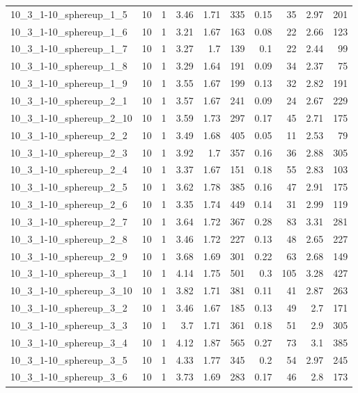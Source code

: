 \begin{center}
\begin{scriptsize}
\begin{longtable}{lrrrrrrrrr}
10\_3\_1-10\_sphereup\_1\_5 & 10 & 1 & 3.46 & 1.71 & 335 & 0.15 & 35 & 2.97 & 201\\
10\_3\_1-10\_sphereup\_1\_6 & 10 & 1 & 3.21 & 1.67 & 163 & 0.08 & 22 & 2.66 & 123\\
10\_3\_1-10\_sphereup\_1\_7 & 10 & 1 & 3.27 & 1.7 & 139 & 0.1 & 22 & 2.44 & 99\\
10\_3\_1-10\_sphereup\_1\_8 & 10 & 1 & 3.29 & 1.64 & 191 & 0.09 & 34 & 2.37 & 75\\
10\_3\_1-10\_sphereup\_1\_9 & 10 & 1 & 3.55 & 1.67 & 199 & 0.13 & 32 & 2.82 & 191\\
10\_3\_1-10\_sphereup\_2\_1 & 10 & 1 & 3.57 & 1.67 & 241 & 0.09 & 24 & 2.67 & 229\\
10\_3\_1-10\_sphereup\_2\_10 & 10 & 1 & 3.59 & 1.73 & 297 & 0.17 & 45 & 2.71 & 175\\
10\_3\_1-10\_sphereup\_2\_2 & 10 & 1 & 3.49 & 1.68 & 405 & 0.05 & 11 & 2.53 & 79\\
10\_3\_1-10\_sphereup\_2\_3 & 10 & 1 & 3.92 & 1.7 & 357 & 0.16 & 36 & 2.88 & 305\\
10\_3\_1-10\_sphereup\_2\_4 & 10 & 1 & 3.37 & 1.67 & 151 & 0.18 & 55 & 2.83 & 103\\
10\_3\_1-10\_sphereup\_2\_5 & 10 & 1 & 3.62 & 1.78 & 385 & 0.16 & 47 & 2.91 & 175\\
10\_3\_1-10\_sphereup\_2\_6 & 10 & 1 & 3.35 & 1.74 & 449 & 0.14 & 31 & 2.99 & 119\\
10\_3\_1-10\_sphereup\_2\_7 & 10 & 1 & 3.64 & 1.72 & 367 & 0.28 & 83 & 3.31 & 281\\
10\_3\_1-10\_sphereup\_2\_8 & 10 & 1 & 3.46 & 1.72 & 227 & 0.13 & 48 & 2.65 & 227\\
10\_3\_1-10\_sphereup\_2\_9 & 10 & 1 & 3.68 & 1.69 & 301 & 0.22 & 63 & 2.68 & 149\\
10\_3\_1-10\_sphereup\_3\_1 & 10 & 1 & 4.14 & 1.75 & 501 & 0.3 & 105 & 3.28 & 427\\
10\_3\_1-10\_sphereup\_3\_10 & 10 & 1 & 3.82 & 1.71 & 381 & 0.11 & 41 & 2.87 & 263\\
10\_3\_1-10\_sphereup\_3\_2 & 10 & 1 & 3.46 & 1.67 & 185 & 0.13 & 49 & 2.7 & 171\\
10\_3\_1-10\_sphereup\_3\_3 & 10 & 1 & 3.7 & 1.71 & 361 & 0.18 & 51 & 2.9 & 305\\
10\_3\_1-10\_sphereup\_3\_4 & 10 & 1 & 4.12 & 1.87 & 565 & 0.27 & 73 & 3.1 & 385\\
10\_3\_1-10\_sphereup\_3\_5 & 10 & 1 & 4.33 & 1.77 & 345 & 0.2 & 54 & 2.97 & 245\\
10\_3\_1-10\_sphereup\_3\_6 & 10 & 1 & 3.73 & 1.69 & 283 & 0.17 & 46 & 2.8 & 173\\

\end{longtable}
\end{scriptsize}
\end{center}

